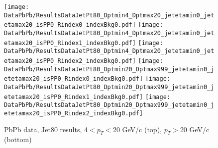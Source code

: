 \documentclass{article}
\begin{document}
\begin{figure}
    \centering
    \texttt{[image: DataPbPb/ResultsDataJetPt80\_Dptmin4\_Dptmax20\_jetetamin0\_jetetamax20\_isPP0\_Rindex0\_indexBkg0.pdf]}
    \texttt{[image: DataPbPb/ResultsDataJetPt80\_Dptmin4\_Dptmax20\_jetetamin0\_jetetamax20\_isPP0\_Rindex1\_indexBkg0.pdf]}
    \texttt{[image: DataPbPb/ResultsDataJetPt80\_Dptmin4\_Dptmax20\_jetetamin0\_jetetamax20\_isPP0\_Rindex2\_indexBkg0.pdf]}
    \texttt{[image: DataPbPb/ResultsDataJetPt80\_Dptmin20\_Dptmax999\_jetetamin0\_jetetamax20\_isPP0\_Rindex0\_indexBkg0.pdf]}
    \texttt{[image: DataPbPb/ResultsDataJetPt80\_Dptmin20\_Dptmax999\_jetetamin0\_jetetamax20\_isPP0\_Rindex1\_indexBkg0.pdf]}
    \texttt{[image: DataPbPb/ResultsDataJetPt80\_Dptmin20\_Dptmax999\_jetetamin0\_jetetamax20\_isPP0\_Rindex2\_indexBkg0.pdf]}
    \caption{PbPb data, Jet80 results, 4$<p_{T}<$20 GeV/c (top), $p_{T}>$20 GeV/c (bottom) }
    \label{simulationfigure}
\end{figure}
\end{document}
